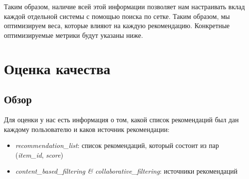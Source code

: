 \documentclass[14pt]{matmex-diploma-custom}
\begin{document}
Таким образом, наличие всей этой информации позволяет нам настраивать вклад каждой отдельной системы с помощью поиска по сетке. Таким образом, мы оптимизируем веса, которые влияют на каждую рекомендацию. Конкретные оптимизируемые метрики будут указаны ниже.
    





\section{Оценка качества}
\label{sec:evaluation}

\subsection{Обзор}

Для оценки у нас есть информация о том, какой список рекомендаций был дан каждому пользователю и каков источник рекомендации:

    \begin{table}[h]
        \centering
        
        \caption{логи выдачи рекомендаций}
        \label{tab:recommendation_logs}
    \end{table}

    \begin{itemize}
        \item \textit{recommendation\_list}: список рекомендаций, который состоит из пар (\textit{item\_id}, \textit{score})
        \item \textit{content\_based\_filtering \& collaborative\_filtering}: источники рекомендаций
    \end{itemize}
\end{document}
